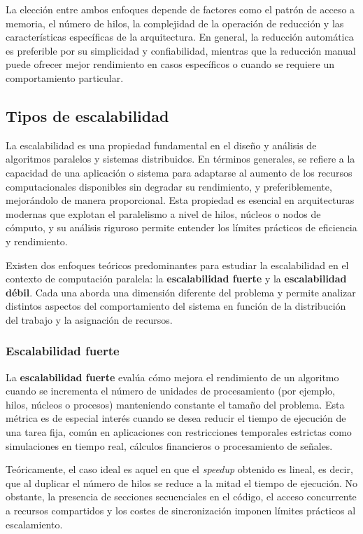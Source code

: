             La elección entre ambos enfoques depende de factores como el patrón de acceso a memoria, el número de hilos, la complejidad de la operación de reducción y las características específicas de la arquitectura. En general, la reducción automática es preferible por su simplicidad y confiabilidad, mientras que la reducción manual puede ofrecer mejor rendimiento en casos específicos o cuando se requiere un comportamiento particular.
            
    \subsection{Tipos de escalabilidad}

        La escalabilidad es una propiedad fundamental en el diseño y análisis de algoritmos paralelos y sistemas distribuidos. En términos generales, se refiere a la capacidad de una aplicación o sistema para adaptarse al aumento de los recursos computacionales disponibles sin degradar su rendimiento, y preferiblemente, mejorándolo de manera proporcional. Esta propiedad es esencial en arquitecturas modernas que explotan el paralelismo a nivel de hilos, núcleos o nodos de cómputo, y su análisis riguroso permite entender los límites prácticos de eficiencia y rendimiento.
        
        Existen dos enfoques teóricos predominantes para estudiar la escalabilidad en el contexto de computación paralela: la \textbf{escalabilidad fuerte} y la \textbf{escalabilidad débil}. Cada una aborda una dimensión diferente del problema y permite analizar distintos aspectos del comportamiento del sistema en función de la distribución del trabajo y la asignación de recursos.
        
        \subsubsection{Escalabilidad fuerte}

            La \textbf{escalabilidad fuerte} evalúa cómo mejora el rendimiento de un algoritmo cuando se incrementa el número de unidades de procesamiento (por ejemplo, hilos, núcleos o procesos) manteniendo constante el tamaño del problema. Esta métrica es de especial interés cuando se desea reducir el tiempo de ejecución de una tarea fija, común en aplicaciones con restricciones temporales estrictas como simulaciones en tiempo real, cálculos financieros o procesamiento de señales.
            
            Teóricamente, el caso ideal es aquel en que el \textit{speedup} obtenido es lineal, es decir, que al duplicar el número de hilos se reduce a la mitad el tiempo de ejecución. No obstante, la presencia de secciones secuenciales en el código, el acceso concurrente a recursos compartidos y los costes de sincronización imponen límites prácticos al escalamiento.
            
